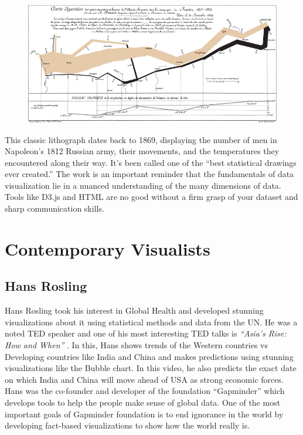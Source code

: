 \documentclass[]{book}
\theoremstyle{definition}
\theoremstyle{definition}
\theoremstyle{definition}
\theoremstyle{remark}
\begin{document}
\begin{figure}
\centering
\includegraphics{images/Minard.png}
\caption{}
\end{figure}

This classic lithograph dates back to 1869, displaying the number of men
in Napoleon's 1812 Russian army, their movements, and the temperatures
they encountered along their way. It's been called one of the ``best
statistical drawings ever created.'' The work is an important reminder
that the fundamentals of data visualization lie in a nuanced
understanding of the many dimensions of data. Tools like D3.js and HTML
are no good without a firm grasp of your dataset and sharp communication
skills.

\section{Contemporary Visualists}\label{contemporary-visualists}

\subsection{Hans Rosling}\label{hans-rosling}

Hans Rosling took his interest in Global Health and developed stunning
visualizations about it using statistical methods and data from the UN.
He was a noted TED speaker and one of his most interesting TED talks is
\emph{``Asia's Rise: How and When''} \citep{hans}. In this, Hans shows
trends of the Western countries vs Developing countries like India and
China and makes predictions using stunning visualizations like the
Bubble chart. In this video, he also predicts the exact date on which
India and China will move ahead of USA as strong economic forces. Hans
was the co-founder and developer of the foundation
``Gapminder''\citep{gapminder} which develops tools to help the people
make sense of global data. One of the most important goals of Gapminder
foundation is to end ignorance in the world by developing fact-based
visualizations to show how the world really is.
\end{document}
